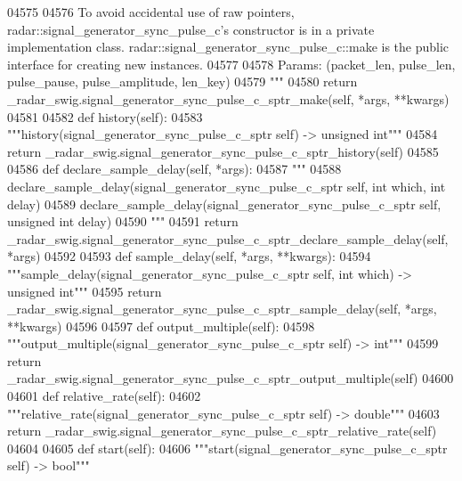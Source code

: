 \begin{DoxyCode}
{{{{{{{{{{{{{{{{04575 \textcolor{stringliteral}{}
04576 \textcolor{stringliteral}{        To avoid accidental use of raw pointers, radar::signal\_generator\_sync\_pulse\_c's constructor is in a
       private implementation class. radar::signal\_generator\_sync\_pulse\_c::make is the public interface for
       creating new instances.}
04577 \textcolor{stringliteral}{}
04578 \textcolor{stringliteral}{        Params: (packet\_len, pulse\_len, pulse\_pause, pulse\_amplitude, len\_key)}
04579 \textcolor{stringliteral}{        """}
04580         \textcolor{keywordflow}{return} \_radar\_swig.signal\_generator\_sync\_pulse\_c\_sptr\_make(self, *args, **kwargs)
04581 
04582     \textcolor{keyword}{def }history(self):
04583         \textcolor{stringliteral}{"""history(signal\_generator\_sync\_pulse\_c\_sptr self) -> unsigned int"""}
04584         \textcolor{keywordflow}{return} \_radar\_swig.signal\_generator\_sync\_pulse\_c\_sptr\_history(self)
04585 
04586     \textcolor{keyword}{def }declare_sample_delay(self, *args):
04587         \textcolor{stringliteral}{"""}
04588 \textcolor{stringliteral}{        declare\_sample\_delay(signal\_generator\_sync\_pulse\_c\_sptr self, int which, int delay)}
04589 \textcolor{stringliteral}{        declare\_sample\_delay(signal\_generator\_sync\_pulse\_c\_sptr self, unsigned int delay)}
04590 \textcolor{stringliteral}{        """}
04591         \textcolor{keywordflow}{return} \_radar\_swig.signal\_generator\_sync\_pulse\_c\_sptr\_declare\_sample\_delay(self, *args)
04592 
04593     \textcolor{keyword}{def }sample_delay(self, *args, **kwargs):
04594         \textcolor{stringliteral}{"""sample\_delay(signal\_generator\_sync\_pulse\_c\_sptr self, int which) -> unsigned int"""}
04595         \textcolor{keywordflow}{return} \_radar\_swig.signal\_generator\_sync\_pulse\_c\_sptr\_sample\_delay(self, *args, **kwargs)
04596 
04597     \textcolor{keyword}{def }output_multiple(self):
04598         \textcolor{stringliteral}{"""output\_multiple(signal\_generator\_sync\_pulse\_c\_sptr self) -> int"""}
04599         \textcolor{keywordflow}{return} \_radar\_swig.signal\_generator\_sync\_pulse\_c\_sptr\_output\_multiple(self)
04600 
04601     \textcolor{keyword}{def }relative_rate(self):
04602         \textcolor{stringliteral}{"""relative\_rate(signal\_generator\_sync\_pulse\_c\_sptr self) -> double"""}
04603         \textcolor{keywordflow}{return} \_radar\_swig.signal\_generator\_sync\_pulse\_c\_sptr\_relative\_rate(self)
04604 
04605     \textcolor{keyword}{def }start(self):
04606         \textcolor{stringliteral}{"""start(signal\_generator\_sync\_pulse\_c\_sptr self) -> bool"""}
}}}}}}}}}}}}}}}}
\end{DoxyCode}
